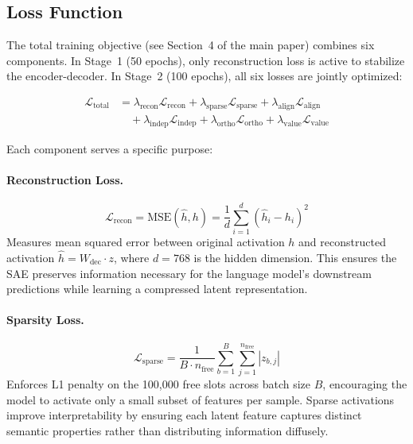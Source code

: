 \subsection{Loss Function}

The total training objective (see Section~4 of the main paper) combines six components. In Stage~1 (50 epochs), only reconstruction loss is active to stabilize the encoder-decoder. In Stage~2 (100 epochs), all six losses are jointly optimized:

\begin{align}
\mathcal{L}_{\text{total}} &= \lambda_{\text{recon}} \mathcal{L}_{\text{recon}} + \lambda_{\text{sparse}} \mathcal{L}_{\text{sparse}} + \lambda_{\text{align}} \mathcal{L}_{\text{align}} \nonumber \\
&\quad + \lambda_{\text{indep}} \mathcal{L}_{\text{indep}} + \lambda_{\text{ortho}} \mathcal{L}_{\text{ortho}} + \lambda_{\text{value}} \mathcal{L}_{\text{value}}
\end{align}

Each component serves a specific purpose:

\paragraph{Reconstruction Loss.} 
\begin{equation}
\mathcal{L}_{\text{recon}} = \text{MSE}(\hat{h}, h) = \frac{1}{d} \sum_{i=1}^{d} (\hat{h}_i - h_i)^2
\end{equation}
Measures mean squared error between original activation $h$ and reconstructed activation $\hat{h} = W_{\text{dec}} \cdot z$, where $d=768$ is the hidden dimension. This ensures the SAE preserves information necessary for the language model's downstream predictions while learning a compressed latent representation.

\paragraph{Sparsity Loss.} 
\begin{equation}
\mathcal{L}_{\text{sparse}} = \frac{1}{B \cdot n_{\text{free}}} \sum_{b=1}^{B} \sum_{j=1}^{n_{\text{free}}} |z_{b,j}|
\end{equation}
Enforces L1 penalty on the 100,000 free slots across batch size $B$, encouraging the model to activate only a small subset of features per sample. Sparse activations improve interpretability by ensuring each latent feature captures distinct semantic properties rather than distributing information diffusely.

